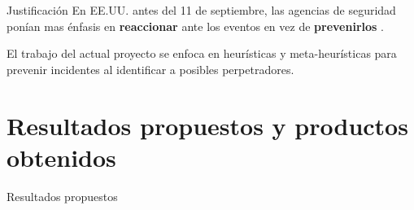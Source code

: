 \documentclass[10pt]{beamer}
\begin{document}
\begin{frame}{Justificación}
  En EE.UU. antes del 11 de septiembre, las agencias de seguridad ponían mas énfasis en \textbf{reaccionar} ante los eventos en vez de \textbf{prevenirlos} \cite{mena2003investigative}.

  El trabajo del actual proyecto se enfoca en heurísticas y meta-heurísticas para prevenir incidentes al identificar a posibles perpetradores.
\end{frame}

\section{Resultados propuestos y productos obtenidos}

\begin{frame}{Resultados propuestos}
\end{frame}
\end{document}
